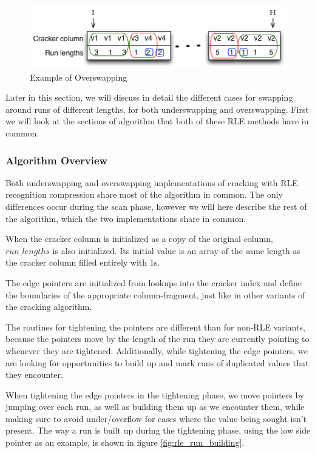 \begin{figure}[H]
  \centering
  \includegraphics[]{images/d11_rle_overswapping}
  \caption{Example of Overswapping}
  \label{fig:rle_overswapping}
\end{figure}

Later in this section, we will discuss in detail the different cases for swapping around runs of different lengths, for both underswapping and overswapping. First we will look at the sections of algorithm that both of these RLE methods have in common.

\subsubsection{Algorithm Overview}

Both underswapping and overswapping implementations of cracking with RLE recognition compression share most of the algorithm in common. The only differences occur during the scan phase, however we will here describe the rest of the algorithm, which the two implementations share in common.

When the cracker column is initialized as a copy of the original column, $run\_lengths$ is also initialized. Its initial value is an array of the same length as the cracker column filled entirely with 1s.

The edge pointers are initialized from lookups into the cracker index and define the boundaries of the appropriate column-fragment, just like in other variants of the cracking algorithm.

The routines for tightening the pointers are different than for non-RLE variants, because the pointers move by the length of the run they are currently pointing to whenever they are tightened. Additionally, while tightening the edge pointers, we are looking for opportunities to build up and mark runs of duplicated values that they encounter.

When tightening the edge pointers in the tightening phase, we move pointers by jumping over each run, as well as building them up as we encounter them, while making sure to avoid under/overflow for cases where the value being sought isn't present. The way a run is built up during the tightening phase, using the low side pointer as an example, is shown in figure \ref{fig:rle_run_building}.

